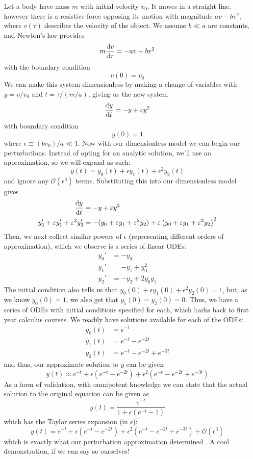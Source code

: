 Let a body have mass $m$ with initial velocity $v_0$. It moves in a straight line, however there is a resistive force opposing its motion 
with magnitude $av - bv^2$, where $v(\tau)$ describes the velocity of the object. We assume $b \ll a$ are constants, and Newton's law provides
$$m \dv{v}{\tau} = -av + bv^2$$
with the boundary condition
$$v(0) = v_0$$
We can make this system dimensionless by making a change of variables with $y = v / v_0$ and $t = \tau / (m / a)$, giving us the new system
$$\dv{y}{t} = -y + \varepsilon y^2$$
with boundary condition
$$y(0) = 1$$
where $\epsilon \equiv (b v_0) / a \ll 1$. Now with our dimensionless model we can begin our perturbations. 
Instead of opting for an analytic solution, 
we'll use an approximation, so we will expand as such:
$$y(t) = y_0(t) + \epsilon y_1(t) + \epsilon^2 y_2(t)$$
and ignore any $\mathcal{O}(\epsilon^3)$ terms. Substituting this into our dimensionless model gives
\begin{align*}
    \dv{y}{t} &= -y + \varepsilon y^2 \\
    y_0' + \varepsilon y_1' + \varepsilon^2 y_2' &= -(y_0 + \varepsilon y_1 + \varepsilon^2 y_2) + \varepsilon \left (y_0 + \varepsilon y_1 + \varepsilon^2 y_2 \right )^2
\end{align*}
Then, we next collect similar powers of $\epsilon$ (representing different orders of approximation), which we observe is a series of 
linear ODEs:
\begin{align*}
    y_0' &= -y_0 \\
    y_1' &= -y_1 + y_0^2 \\
    y_2' &= -y_2 + 2y_0 y_1
\end{align*}
The initial condition also tells us that $y_0 (0) + \epsilon y_1(0) + \epsilon^2 y_2(0) = 1$, but, as we know $y_0(0) = 1$, 
we also get that $y_1(0) = y_2(0) = 0$. Thus, we have a series of ODEs with initial conditions specified for each, which 
harks back to first year calculus courses. We readily have solutions available for each of the ODEs:
\begin{align*}
    y_0(t) &= e^{-t} \\
    y_1(t) &= e^{-t} - e^{-2t} \\
    y_2(t) &= e^{-t} - e^{-2t} + e^{-3t}
\end{align*}
and thus, our approximate solution to $y$ can be given
$$y(t) \approx e^{-t} + \epsilon(e^{-t} - e^{-2t}) + \epsilon^2 (e^{-t} - e^{-2t} + e^{-3t})$$
As a form of validation, with omnipotent knowledge we can state that the actual solution to the original equation can 
be given as 
$$y(t) = \frac{e^{-t}}{1 + \epsilon(e^{-t} - 1)}$$
which has the Taylor series expansion (in $\epsilon$):
$$y(t) = e^{-t} + \epsilon(e^{-t} - e^{-2t}) + \epsilon^2(e^{-t} - e^{-2t} + e^{-3t}) + \mathcal{O}(\epsilon^3)$$
which is exactly what our perturbation approximation determined \cite{perturbation-example}. A cool demonstration, if we can say so ourselves!


